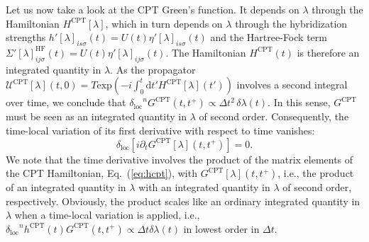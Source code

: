 \documentclass[twocolumn,prb,showpacs,aps,superscriptaddress]{revtex4}
\newcommand{\dt}[0]{\ensuremath{\mathrm{d}t}}
\renewcommand{\exp}[1]{\ensuremath{\mathrm{exp}\left({#1}\right)}}
\newcommand{\deltaloc}[0]{\ensuremath{\delta_\mathrm{loc}}}
\begin{document}
Let us now take a look at the CPT Green's function. It depends on $\lambda$
through the Hamiltonian $H^\mathrm{CPT}[\lambda]$, which in turn depends on
$\lambda$ through the hybridization strengths $h'[\lambda]_{is\sigma}(t) = U(t)
\eta'[\lambda]_{is\sigma}(t)$ and the Hartree-Fock term
$\Sigma'[\lambda]^\text{HF}_{ij\sigma}(t) = U(t)\eta'[\lambda]_{ij\sigma}(t)$.
The Hamiltonian $H^\text{CPT}(t)$ is therefore an integrated quantity in
$\lambda$. As the propagator $\mathcal{U}^\text{CPT}[\lambda](t,0) = T
\exp{-i\int_0^t \dt' H^\text{CPT}[\lambda](t')}$ involves a second integral
over time, we conclude that $\deltaloc^n G^\text{CPT}(t,t^+) \propto \Delta
t^2 \, \delta \lambda(t)$. In this sense, $G^\text{CPT}$ must be seen as an
integrated quantity in $\lambda$ of second order. Consequently, the time-local
variation of its first derivative with respect to time vanishes: 
\begin{equation}
  \label{eq:gcpt_vanishes}
  \deltaloc [i\partial_t G^\text{CPT}[\lambda](t,t^+)]
  = 0.
\end{equation}
We note that the time derivative involves the product of the matrix elements of
the CPT Hamiltonian, Eq.\ (\ref{eq:hcpt}), with $G^\text{CPT}[\lambda](t,t^+)$,
i.e., the product of an integrated quantity in $\lambda$ with an integrated
quantity in $\lambda$ of second order, respectively.  Obviously, the product
scales like an ordinary integrated quantity in $\lambda$ when a time-local
variation is applied, i.e., $\deltaloc^n h^\text{CPT}(t) G^\text{CPT}(t,t^+)
\propto \Delta t \delta\lambda(t)$ in lowest order in $\Delta t$.
\end{document}
